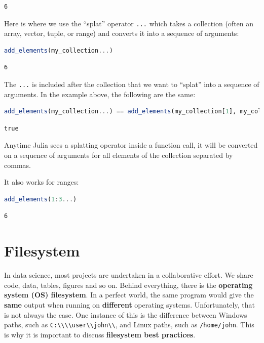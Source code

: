 \documentclass[
  notoc %
]{tufte-book}
\newcommand{\passthrough}[1]{#1}
\begin{document}
\begin{lstlisting}[language=Output]
6
\end{lstlisting}

Here is where we use the ``splat'' operator
\passthrough{\lstinline!...!} which takes a collection (often an array,
vector, tuple, or range) and converts it into a sequence of arguments:

\begin{lstlisting}[language=Julia]
add_elements(my_collection...)
\end{lstlisting}

\begin{lstlisting}[language=Output]
6
\end{lstlisting}

The \passthrough{\lstinline!...!} is included after the collection that
we want to ``splat'' into a sequence of arguments. In the example above,
the following are the same:

\begin{lstlisting}[language=Julia]
add_elements(my_collection...) == add_elements(my_collection[1], my_collection[2], my_collection[3])
\end{lstlisting}

\begin{lstlisting}[language=Output]
true
\end{lstlisting}

Anytime Julia sees a splatting operator inside a function call, it will
be converted on a sequence of arguments for all elements of the
collection separated by commas.

It also works for ranges:

\begin{lstlisting}[language=Julia]
add_elements(1:3...)
\end{lstlisting}

\begin{lstlisting}[language=Output]
6
\end{lstlisting}

\hypertarget{sec:filesystem}{%
\section{Filesystem}\label{sec:filesystem}}

In data science, most projects are undertaken in a collaborative effort.
We share code, data, tables, figures and so on. Behind everything, there
is the \textbf{operating system (OS) filesystem}. In a perfect world,
the same program would give the \textbf{same} output when running on
\textbf{different} operating systems. Unfortunately, that is not always
the case. One instance of this is the difference between Windows paths,
such as \passthrough{\lstinline!C:\\\\user\\john\\!}, and Linux paths,
such as \passthrough{\lstinline!/home/john!}. This is why it is
important to discuss \textbf{filesystem best practices}.
\end{document}
